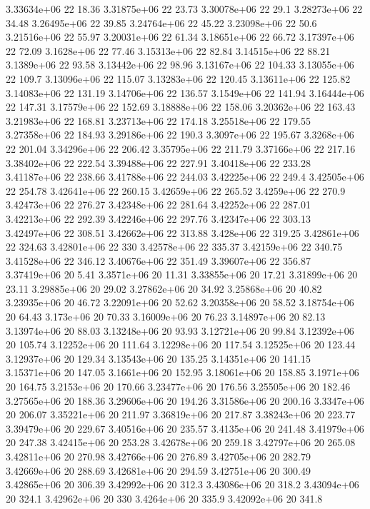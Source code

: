 3.33634e+06 22 18.36
3.31875e+06 22 23.73
3.30078e+06 22 29.1
3.28273e+06 22 34.48
3.26495e+06 22 39.85
3.24764e+06 22 45.22
3.23098e+06 22 50.6
3.21516e+06 22 55.97
3.20031e+06 22 61.34
3.18651e+06 22 66.72
3.17397e+06 22 72.09
3.1628e+06 22 77.46
3.15313e+06 22 82.84
3.14515e+06 22 88.21
3.1389e+06 22 93.58
3.13442e+06 22 98.96
3.13167e+06 22 104.33
3.13055e+06 22 109.7
3.13096e+06 22 115.07
3.13283e+06 22 120.45
3.13611e+06 22 125.82
3.14083e+06 22 131.19
3.14706e+06 22 136.57
3.1549e+06 22 141.94
3.16444e+06 22 147.31
3.17579e+06 22 152.69
3.18888e+06 22 158.06
3.20362e+06 22 163.43
3.21983e+06 22 168.81
3.23713e+06 22 174.18
3.25518e+06 22 179.55
3.27358e+06 22 184.93
3.29186e+06 22 190.3
3.3097e+06 22 195.67
3.3268e+06 22 201.04
3.34296e+06 22 206.42
3.35795e+06 22 211.79
3.37166e+06 22 217.16
3.38402e+06 22 222.54
3.39488e+06 22 227.91
3.40418e+06 22 233.28
3.41187e+06 22 238.66
3.41788e+06 22 244.03
3.42225e+06 22 249.4
3.42505e+06 22 254.78
3.42641e+06 22 260.15
3.42659e+06 22 265.52
3.4259e+06 22 270.9
3.42473e+06 22 276.27
3.42348e+06 22 281.64
3.42252e+06 22 287.01
3.42213e+06 22 292.39
3.42246e+06 22 297.76
3.42347e+06 22 303.13
3.42497e+06 22 308.51
3.42662e+06 22 313.88
3.428e+06 22 319.25
3.42861e+06 22 324.63
3.42801e+06 22 330
3.42578e+06 22 335.37
3.42159e+06 22 340.75
3.41528e+06 22 346.12
3.40676e+06 22 351.49
3.39607e+06 22 356.87
3.37419e+06 20 5.41
3.3571e+06 20 11.31
3.33855e+06 20 17.21
3.31899e+06 20 23.11
3.29885e+06 20 29.02
3.27862e+06 20 34.92
3.25868e+06 20 40.82
3.23935e+06 20 46.72
3.22091e+06 20 52.62
3.20358e+06 20 58.52
3.18754e+06 20 64.43
3.173e+06 20 70.33
3.16009e+06 20 76.23
3.14897e+06 20 82.13
3.13974e+06 20 88.03
3.13248e+06 20 93.93
3.12721e+06 20 99.84
3.12392e+06 20 105.74
3.12252e+06 20 111.64
3.12298e+06 20 117.54
3.12525e+06 20 123.44
3.12937e+06 20 129.34
3.13543e+06 20 135.25
3.14351e+06 20 141.15
3.15371e+06 20 147.05
3.1661e+06 20 152.95
3.18061e+06 20 158.85
3.1971e+06 20 164.75
3.2153e+06 20 170.66
3.23477e+06 20 176.56
3.25505e+06 20 182.46
3.27565e+06 20 188.36
3.29606e+06 20 194.26
3.31586e+06 20 200.16
3.3347e+06 20 206.07
3.35221e+06 20 211.97
3.36819e+06 20 217.87
3.38243e+06 20 223.77
3.39479e+06 20 229.67
3.40516e+06 20 235.57
3.4135e+06 20 241.48
3.41979e+06 20 247.38
3.42415e+06 20 253.28
3.42678e+06 20 259.18
3.42797e+06 20 265.08
3.42811e+06 20 270.98
3.42766e+06 20 276.89
3.42705e+06 20 282.79
3.42669e+06 20 288.69
3.42681e+06 20 294.59
3.42751e+06 20 300.49
3.42865e+06 20 306.39
3.42992e+06 20 312.3
3.43086e+06 20 318.2
3.43094e+06 20 324.1
3.42962e+06 20 330
3.4264e+06 20 335.9
3.42092e+06 20 341.8
